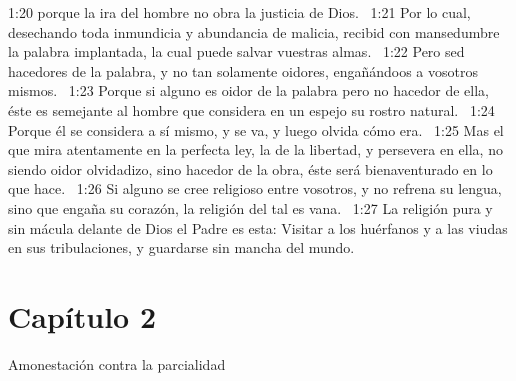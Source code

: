1:20 porque la ira del hombre no obra la justicia de Dios.  
1:21 Por lo cual, desechando toda inmundicia y abundancia de malicia, recibid con mansedumbre la palabra implantada, la cual puede salvar vuestras almas.  
1:22 Pero sed hacedores de la palabra, y no tan solamente oidores, engañándoos a vosotros mismos.  
1:23 Porque si alguno es oidor de la palabra pero no hacedor de ella, éste es semejante al hombre que considera en un espejo su rostro natural.  
1:24 Porque él se considera a sí mismo, y se va, y luego olvida cómo era.  
1:25 Mas el que mira atentamente en la perfecta ley, la de la libertad, y persevera en ella, no siendo oidor olvidadizo, sino hacedor de la obra, éste será bienaventurado en lo que hace.  
1:26 Si alguno se cree religioso entre vosotros, y no refrena su lengua, sino que engaña su corazón, la religión del tal es vana.  
1:27 La religión pura y sin mácula delante de Dios el Padre es esta: Visitar a los huérfanos y a las viudas en sus tribulaciones, y guardarse sin mancha del mundo.  
\section*{Capítulo 2}
Amonestación contra la parcialidad  

